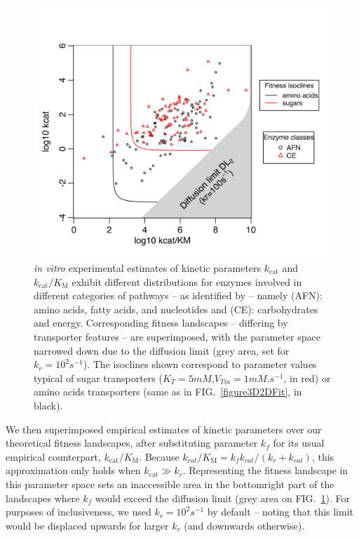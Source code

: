\documentclass[nogrid,crop,final]{MBE2}%
\newcommand{\othercaption}[1]{\caption{\setlength{\baselineskip}{1.5\baselineskip}#1}}
\begin{document}
\begin{figure}[h!]
\centering
\includegraphics[scale=0.6,trim=0cm 0cm 0cm 1cm,clip]{Figures/2DFitContour_DataClasses.jpeg}  
\othercaption{\textit{in vitro} experimental estimates of kinetic parameters $k_\text{cat}$ and $k_\text{cat}/K_\text{M}$ exhibit different distributions for enzymes involved in different categories of pathways -- as identified by \citet{Bar-Even11} -- namely (AFN): amino acids, fatty acids, and nucleotides and (CE): carbohydrates and energy. Corresponding fitness landscapes -- differing by transporter features -- are superimposed, with the parameter space narrowed down due to the diffusion limit (grey area, set for $k_r=10^2 s^{-1}$). The isoclines shown correspond to parameter values typical of sugar transporters ($K_T=5mM$,$V_{Tm}=1mM.s^{-1}$, in red) \citep{Maier02} or amino acids transporters (same as in FIG.~\ref{figure3D2DFit}, in black).}
\label{figure2D_BarEven_Dataset}
\end{figure}

We then superimposed empirical estimates of kinetic parameters over our theoretical fitness landscapes, after substituting parameter $k_f$ for its usual empirical counterpart, $k_\text{cat} / K_\text{M}$. Because $k_{cat}/K_\text{M} = k_fk_{cat}/(k_r+k_{cat})$, this approximation only holds when $k_\text{cat} \gg k_r$. Representing the fitness landscape in this parameter space
sets an inaccessible area in the bottomright part of the landscapes where $k_f$ would exceed the diffusion limit (grey area on FIG.~\ref{figure2D_BarEven_Dataset}). For purposes of inclusiveness, we used $k_r=10^{2}s^{-1}$ by default -- noting that this limit would be displaced upwards for larger $k_r$ (and downwards otherwise).
\end{document}
